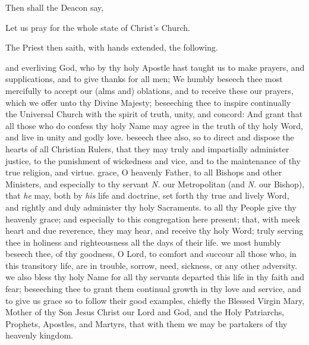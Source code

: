 \clearpage
\begin{rubric}
    Then shall the Deacon say,
\end{rubric}
\centerline{Let us pray for the whole state of Christ's Church.}
\begin{rubric}
    The Priest then saith, with hands extended, the following.
\end{rubric}
 and everliving God, who by thy holy Apostle hast taught us to make prayers, and supplications, and to give thanks for all men; We humbly beseech thee most mercifully to accept our (alms and) oblations, and to receive these our prayers, which we offer unto thy Divine Majesty; beseeching thee to inspire continually the Universal Church with the spirit of truth, unity, and concord: And grant that all those who do confess thy holy Name may agree in the truth of thy holy Word, and live in unity and godly love.
 beseech thee also, so to direct and dispose the hearts of all Christian Rulers, that they may truly and impartially administer justice, to the punishment of wickedness and vice, and to the maintenance of thy true religion, and virtue.
 grace, O heavenly Father, to all Bishops and other Ministers, and especially to thy servant \emph{N.} our Metropolitan (and \emph{N.} our Bishop), that \textit{he} may, both by \textit{his} life and doctrine, set forth thy true and lively Word, and rightly and duly administer thy holy Sacraments.
 to all thy People give thy heavenly grace; and especially to this congregation here present; that, with meek heart and due reverence, they may hear, and receive thy holy Word; truly serving thee in holiness and righteousness all the days of their life.
 we most humbly beseech thee, of thy goodness, O Lord, to comfort and succour all those who, in this transitory life, are in trouble, sorrow, need, sickness, or any other adversity.
 we also bless thy holy Name for all thy servants departed this life in thy faith and fear; beseeching thee to grant them continual growth in thy love and service, and to give us grace so to follow their good examples, chiefly the Blessed Virgin Mary, Mother of thy Son Jesus Christ our Lord and God, and the Holy Patriarchs, Prophets, Apostles, and Martyrs, that with them we may be partakers of thy heavenly kingdom.
